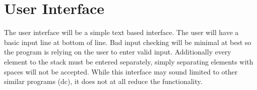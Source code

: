 \section{User Interface}
    The user interface will be a simple text based interface. The user will have
    a basic input line at bottom of line. Bad input checking will be minimal at
    best so the program is relying on the user to enter valid input.
    Additionally every element to the stack must be entered separately,
    simply separating elements with spaces will not be accepted. While this
    interface may sound limited to other similar programs (dc), it does not at all
    reduce the functionality.
